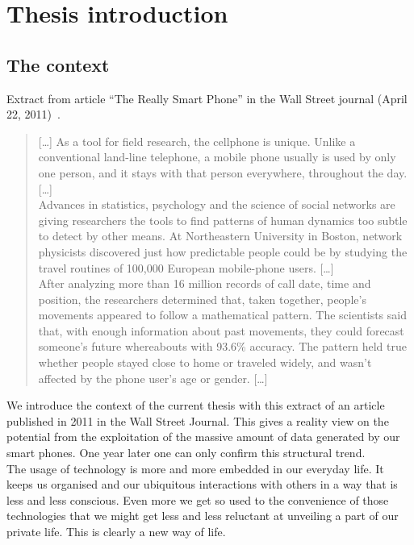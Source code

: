 \chapter{Thesis introduction}

\section{The context}

Extract from article ``The Really Smart Phone'' in the Wall Street journal (April 22, 2011)~\cite{really-smart-phone}.

\begin{quotation}
  [\dots]
  As a tool for field research, the cellphone is unique. Unlike a
  conventional land-line telephone, a mobile phone usually is used by
  only one person, and it stays with that person everywhere,
  throughout the day.
  [\dots]\\

  Advances in statistics, psychology and the
  science of social networks are giving researchers the tools to find
  patterns of human dynamics too subtle to detect by other means. At
  Northeastern University in Boston, network physicists discovered
  just how predictable people could be by studying the travel routines
  of 100,000 European mobile-phone users.
  [\dots]\\

  After analyzing more than
  16 million records of call date, time and position, the researchers
  determined that, taken together, people's movements appeared to
  follow a mathematical pattern. The scientists said that, with enough
  information about past movements, they could forecast someone's
  future whereabouts with 93.6\% accuracy.
  The pattern held true whether people stayed close to home or
  traveled widely, and wasn't affected by the phone user's age or
  gender.
  [\dots]\\
\end{quotation}


We introduce the context of the current thesis with this extract of an article published in 2011 in the Wall Street Journal.
This gives a reality view on the potential from the exploitation of the massive amount of data generated by our smart phones.
One year later one can only confirm this structural trend.\\

The usage of technology is more and more embedded in our everyday life.
It keeps us organised and our ubiquitous interactions with others in a way that is less and less conscious.
Even more we get so used to the convenience of those technologies that we might get less and less reluctant at unveiling a part of our private life.
This is clearly a new way of life.\\

